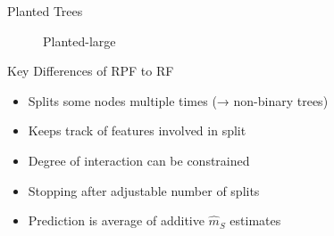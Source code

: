 \documentclass[aspectratio=169,12pt]{beamer}
\providecommand{\tightlist}{%
  \setlength{\itemsep}{2pt}\setlength{\parskip}{0pt}}
\begin{document}
\begin{frame}{Planted Trees}
\label{planted-trees-1}
\begin{figure}


\caption{\label{fig-planted}Planted-large}

\end{figure}%
\end{frame}

\begin{frame}{Key Differences of RPF to RF}
\label{key-differences-of-rpf-to-rf}
\begin{itemize}[<+->]
\tightlist
\item
  Splits some nodes multiple times (→ non-binary trees)
\item
  Keeps track of features involved in split
\item
  Degree of interaction can be constrained
\item
  Stopping after adjustable number of splits
\item
  Prediction is average of additive \(\hat{m}_S\) estimates
\end{itemize}
\end{frame}
\end{document}
